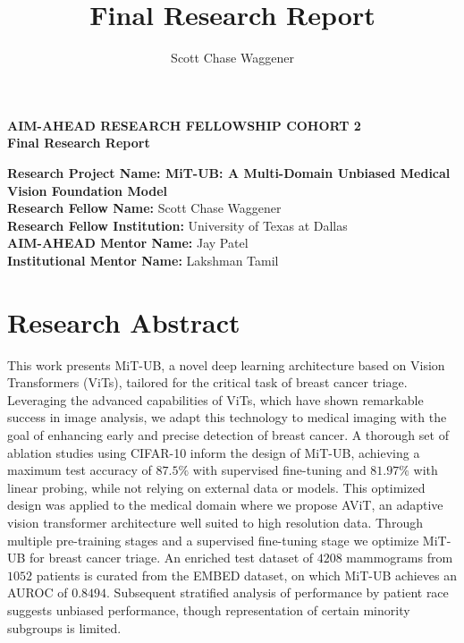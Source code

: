 \documentclass[12pt]{article}
\title{Final Research Report}
\author{Scott Chase Waggener}
\renewcommand{\large}{\fontsize{12}{14}\selectfont}
\renewcommand{\headrulewidth}{0pt}
\begin{document}
\fancypagestyle{plain}{
  \fancyhf{}
  \fancyfoot[C]{\thepage}
  \fancyhead[R]{V1 9/2023}
  \renewcommand{\headrulewidth}{0pt}
}
\pagestyle{plain}


\begin{titlepage}
    \centering
    \vspace*{1in}
    \large \textbf{AIM-AHEAD RESEARCH FELLOWSHIP COHORT 2} \\
    \vspace{1\baselineskip}
    \large \textbf{Final Research Report} \\
    \vspace{2\baselineskip}
    \raggedright
    \textbf{Research Project Name: MiT-UB: A Multi-Domain Unbiased Medical Vision Foundation Model} \\[2\baselineskip]
    \large \textbf{Research Fellow Name:} Scott Chase Waggener \\[2\baselineskip]
    \large \textbf{Research Fellow Institution:} University of Texas at Dallas \\[2\baselineskip]
    \large \textbf{AIM-AHEAD Mentor Name:} Jay Patel \\[2\baselineskip]
    \large \textbf{Institutional Mentor Name:} Lakshman Tamil
\end{titlepage}

\newpage
\section{Research Abstract}
\noindent
This work presents MiT-UB, a novel deep learning architecture based on Vision Transformers
(ViTs), tailored for the critical task of breast cancer triage. Leveraging the advanced capabilities
of ViTs, which have shown remarkable success in image analysis, we adapt this technology to
medical imaging with the goal of enhancing early and precise detection of breast cancer.
A thorough set of ablation studies using CIFAR-10 inform the design of MiT-UB, achieving a maximum test accuracy of
$87.5\%$ with supervised fine-tuning and $81.97\%$ with linear probing, while not relying on external data or models.
This optimized design was applied to the medical domain where we propose AViT, an adaptive vision transformer architecture
well suited to high resolution data. Through multiple pre-training stages and a supervised fine-tuning stage we optimize
MiT-UB for breast cancer triage. An enriched test dataset of $4208$ mammograms from $1052$ patients is curated from the EMBED dataset, on which MiT-UB achieves an AUROC of $0.8494$. Subsequent stratified analysis of performance by patient race
suggests unbiased performance, though representation of certain minority subgroups is limited. 
\end{document}
